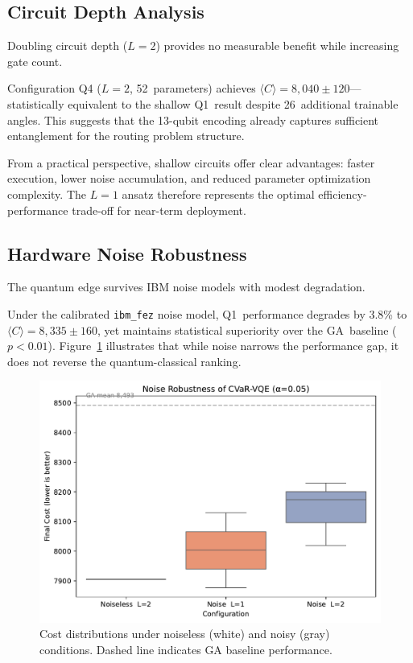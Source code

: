 \subsection{Circuit Depth Analysis}

Doubling circuit depth ($L=2$) provides no measurable benefit while increasing 
gate count.

Configuration Q4 ($L=2$, 52~parameters) achieves $\langle C\rangle=8{,}040\pm120$—statistically 
equivalent to the shallow Q1~result despite 26~additional trainable angles. 
This suggests that the 13-qubit encoding already captures sufficient entanglement 
for the routing problem structure.

From a practical perspective, shallow circuits offer clear advantages: faster 
execution, lower noise accumulation, and reduced parameter optimization complexity. 
The $L=1$ ansatz therefore represents the optimal efficiency-performance trade-off 
for near-term deployment.

\subsection{Hardware Noise Robustness}

The quantum edge survives IBM noise models with modest degradation.

Under the calibrated \texttt{ibm\_fez} noise model, Q1~performance degrades by 
3.8\% to $\langle C\rangle=8{,}335\pm160$, yet maintains statistical superiority 
over the GA~baseline ($p<0.01$). Figure~\ref{fig:noise} illustrates that while 
noise narrows the performance gap, it does not reverse the quantum-classical ranking.

\begin{figure}[h]
  \centering
  \includegraphics[width=.7\linewidth]{fig/noise_boxplot.pdf}
  \caption{Cost distributions under noiseless (white) and noisy (gray) conditions. 
           Dashed line indicates GA baseline performance.}
  \label{fig:noise}
\end{figure}

